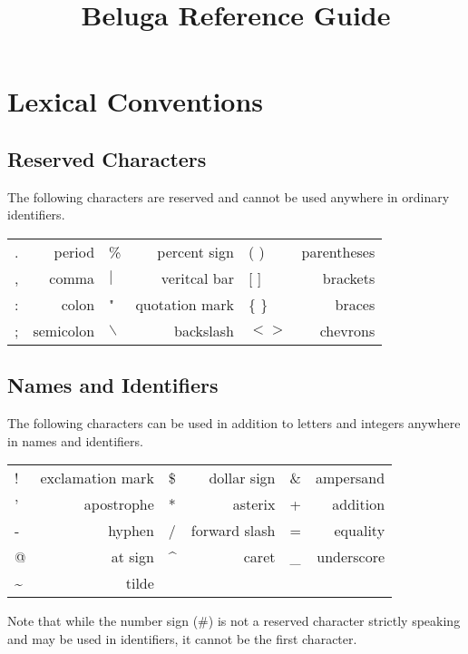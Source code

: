 \documentclass[11pt]{article}
\begin{document}
\title{Beluga Reference Guide}
\author{}
\date{}
\maketitle

\newpage

\section{Lexical Conventions}
\subsection{Reserved Characters}
The following characters are reserved and cannot be used anywhere in ordinary identifiers.
\begin{center}
\begin{tabular}{ | l r | l r | l r }
  . & period & \% & percent sign &  ( )  & parentheses \\
 , & comma & $\vert$ & veritcal bar & [ ] & brackets\\
: & colon &  " & quotation mark  & \{ \} & braces  \\ 
; & semicolon & $\backslash$ & backslash  & $< >$ & chevrons  \\
\end{tabular}
\end{center}

\subsection{Names and Identifiers}
The following characters can be used in addition to letters and integers anywhere in names and identifiers.
\begin{center}
\begin{tabular}{ | l r | l r | l r }
 ! & exclamation mark & \$ & dollar sign & \& & ampersand\\
' & apostrophe &  * & asterix  & + & addition \\ 
- & hyphen & / & forward slash  & = & equality  \\
@ & at sign & \^{} & caret  &  \_  & underscore  \\
\~{} & tilde &\\
\end{tabular}
\end{center}
Note that while the number sign (\#) is not a reserved  character strictly speaking and may be used in identifiers, it cannot be the first character.  
\end{document}
